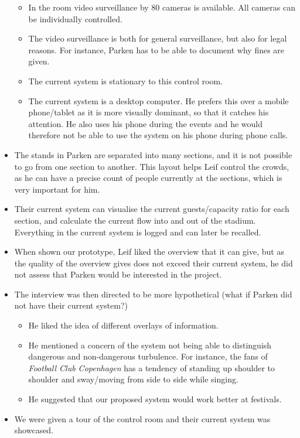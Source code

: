 \begin{itemize}
    \begin{itemize}
        \item In the room video surveillance by 80 cameras is available. All cameras can be individually controlled.
        \item The video surveillance is both for general surveillance, but also for legal reasons. For instance, Parken has to be able to document why fines are given.
        \item The current system is stationary to this control room.
        \item The current system is a desktop computer. He prefers this over a mobile phone/tablet as it is more visually dominant, so that it catches his attention. He also uses his phone during the events and he would therefore not be able to use the system on his phone during phone calls.
    \end{itemize}
    \item The stands in Parken are separated into many sections, and it is not possible to go from one section to another. This layout helps Leif control the crowds, as he can have a precise count of people currently at the sections, which is very important for him.
    \item Their current system can visualise the current guests/capacity ratio for each section, and calculate the current flow into and out of the stadium. Everything in the current system is logged and can later be recalled.
    \item When shown our prototype, Leif liked the overview that it can give, but as the quality of the overview gives does not exceed their current system, he did not assess that Parken would be interested in the project.
    \item The interview was then directed to be more hypothetical (what if Parken did not have their current system?)
    \begin{itemize}
        \item He liked the idea of different overlays of information.
        \item He mentioned a concern of the system not being able to distinguish dangerous and non-dangerous turbulence. For instance, the fans of \emph{Football Club Copenhagen} has a tendency of standing up shoulder to shoulder and sway/moving from side to side while singing.
        \item He suggested that our proposed system would work better at festivals.
    \end{itemize}
    \item We were given a tour of the control room and their current system was showcased.

\end{itemize}
